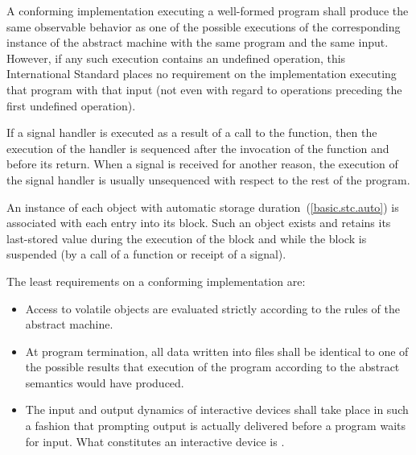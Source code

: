 %
%
\pnum
A conforming implementation executing a well-formed program shall
produce the same observable behavior as one of the possible executions
of the corresponding instance of the abstract machine with the
same program and the same input. However, if any such execution contains an undefined operation, this International Standard places no
requirement on the implementation executing that program with that input
(not even with regard to operations preceding the first undefined
operation).

%
%
%
%
\pnum
If a signal handler is executed as a result of a call to the 
function, then the execution of the handler is sequenced after the invocation
of the  function and before its return.
\enternote When a signal is received for another reason, the execution of the
signal handler is usually unsequenced with respect to the rest of the program.
\exitnote

\pnum
An instance of each object with automatic storage
duration~(\ref{basic.stc.auto}) is associated with each entry into its
block. Such an object exists and retains its last-stored value during
the execution of the block and while the block is suspended (by a call
of a function or receipt of a signal).

\pnum
The least requirements on a conforming implementation are:

\begin{itemize}

\item
Access to volatile objects are evaluated strictly according to the
rules of the abstract machine.

\item
At program termination, all data written into files shall be
identical to one of the possible results that execution of the program
according to the abstract semantics would have produced.

\item
The input and output dynamics of interactive devices shall take
place in such a fashion that prompting output is actually delivered before a program waits for input. What constitutes an interactive device is
.

\end{itemize}

